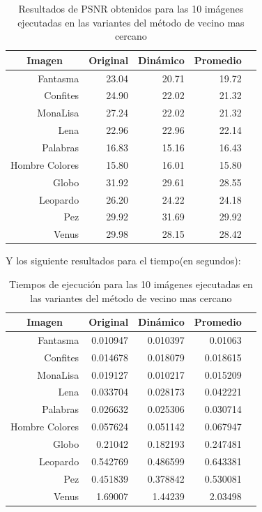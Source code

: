 \documentclass[a4paper]{article}
\newcounter{col}
\begin{document}
\begin{table}[H]
\centering
\begin{tabular}{|r|r|r|r|r|}
\hline
\multicolumn{1}{|c|}{Imagen} & \multicolumn{1}{c|}{Original} & \multicolumn{1}{c|}{Dinámico} & \multicolumn{1}{c|}{Promedio} \\ \hline
Fantasma & 23.04 & 20.71 & 19.72\\ \hline
Confites & 24.90 &  22.02 & 21.32 \\ \hline
MonaLisa &27.24 &  22.02 & 21.32  \\ \hline
Lena & 22.96 &22.96 & 22.14\\ \hline
Palabras & 16.83 &  15.16 & 16.43 \\ \hline
Hombre Colores & 15.80 & 16.01 & 15.80  \\ \hline
Globo & 31.92 &  29.61 & 28.55 \\ \hline
Leopardo & 26.20 &  24.22 & 24.18 \\ \hline
Pez & 29.92 &  31.69 & 29.92  \\ \hline
Venus  & 29.98 &  28.15 & 28.42 \\ \hline
\end{tabular}
\caption{Resultados de PSNR obtenidos para las 10 im\'agenes ejecutadas en las variantes del m\'etodo de vecino mas cercano}
\label{}
\end{table}


Y los siguiente resultados para el tiempo(en segundos):\\
\begin{table}[H]
\centering
\begin{tabular}{|r|r|r|r|r|}
\hline
\multicolumn{1}{|c|}{Imagen} & \multicolumn{1}{c|}{Original} & \multicolumn{1}{c|}{Dinámico} & \multicolumn{1}{c|}{Promedio} \\ \hline
Fantasma & 0.010947 & 0.010397 & 0.01063\\ \hline
Confites & 0.014678 &  0.018079 & 0.018615 \\ \hline
MonaLisa &0.019127 &  0.010217 & 0.015209  \\ \hline
Lena & 0.033704 & 0.028173 & 0.042221 \\ \hline
Palabras & 0.026632 &  0.025306 & 0.030714 \\ \hline
Hombre Colores & 0.057624& 0.051142 & 0.067947 \\ \hline
Globo & 0.21042 &  0.182193 & 0.247481 \\ \hline
Leopardo & 0.542769 &  0.486599 & 0.643381\\ \hline
Pez & 0.451839 & 0.378842 & 0.530081  \\ \hline
Venus  & 1.69007 &  1.44239 & 2.03498 \\ \hline
\end{tabular}
\caption{Tiempos de ejecución para las 10 im\'agenes ejecutadas en las variantes del m\'etodo de vecino mas cercano}
\label{tiemposk3}
\end{table}
\end{document}
